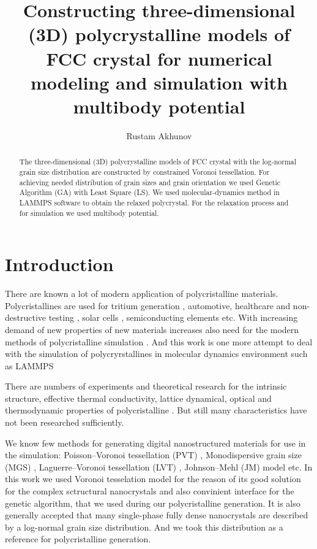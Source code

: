 \documentclass{article}
\begin{document}
\title{Constructing three-dimensional (3D) polycrystalline models of FCC crystal for numerical modeling and simulation with multibody potential}
\author{Rustam Akhunov}

\maketitle

\tableofcontents

\begin{abstract}
The three-dimensional (3D) polycrystalline models of FCC crystal with the log-normal grain size distribution are constructed by constrained Voronoi tessellation. For achieving needed distribution of grain sizes and grain orientation we used Genetic Algorithm (GA) with Least Square (LS). We used molecular-dynamics method in LAMMPS software to obtain the relaxed polycrystal. For the relaxation process and for simulation we used multibody potential.
\end{abstract}


\section{Introduction}

There are known a lot of modern application of polycristalline materials. Polycristallines are used for tritium generation \cite{john99}, automotive, healthcare and non-destructive testing \cite{pardo11}, solar cells \cite{schrop98}, semiconducting elements \cite{harb85} etc. With increasing demand of new properties of new materials increases also need for the modern methods of polycristalline simulation \cite{shen15}. And this work is one more attempt to deal with the simulation of polycryrstallines in molecular dynamics environment such as LAMMPS \cite{plimp95, plimp00}

There are numbers of experiments and theoretical research for the intrinsic structure, effective thermal conductivity, lattice dynamical, optical and thermodynamic properties of polycristalline \cite{shen15}. But still many characteristics have not been researched sufficiently.

We know few methods for generating digital nanostructured materials for use in the simulation: Poisson–Voronoi tessellation (PVT) \cite{wear86}, Monodispersive grain size (MGS) \cite{wang96}, Laguerre–Voronoi tessellation (LVT) \cite{fan04}, Johnson–Mehl (JM) model \cite{okabe00} etc. In this work we used Voronoi tesselation model for the reason of its good solution for the complex sctructural nanocrystals and also convinient interface for the genetic algorithm, that we used during our polycristalline generation. It is also generally accepted that many single-phase fully dense nanocrystals are described by a log-normal grain size distribution. And we took this distribution as a reference for polycristalline generation.
\end{document}
